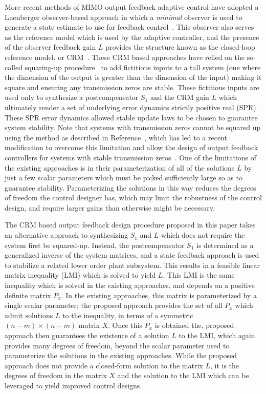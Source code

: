 More recent methods of MIMO output feedback adaptive control have adopted a Luenberger observer-based approach in which a \textit{minimal} observer is used to generate a state estimate to use for feedback control\ \cite{lavretsky.output.2010, lavretskywise.book.2013, qu.jgcd.2016, qu.gnc.2013, wise.obltrdesign.2013}.
This observer also serves as the reference model which is used by the adaptive controller, and the presence of the observer feedback gain $L$ provides the structure known as the closed-loop reference model, or CRM\ \cite{gibson.aiaacrm.2012, gibson.acc.2013, gibson.ecc.2013, gibson.ieeeaccess.2013}.
These CRM based approaches have relied on the so-called squaring-up procedure\ \cite{misra.squareup.1992} to add fictitious inputs to a tall system (one where the dimension of the output is greater than the dimension of the input) making it square and ensuring any transmission zeros are stable.
These fictitious inputs are used only to synthesize a postcompensator $S_{1}$ and the CRM gain $L$ which ultimately render a set of underlying error dynamics strictly positive real (SPR).
These SPR error dynamics allowed stable update laws to be chosen to guarantee system stability.
Note that systems with transmission zeros cannot be squared up using the method as described in Reference\ \cite{misra.squareup.1992}, which has led to a recent modification to overcome this limitation and allow the design of output feedback controllers for systems with stable transmission zeros\ \cite{quwiese.ifac.2014}.
One of the limitations of the existing approaches is in their parameterization of all of the solutions $L$ by just a few scalar parameters which must be picked sufficiently large so as to guarantee stability.
Parameterizing the solutions in this way reduces the degrees of freedom the control designer has, which may limit the robustness of the control design, and require larger gains than otherwise might be necessary.

The CRM based output feedback design procedure proposed in this paper takes an alternative approach to synthesizing $S_{1}$ and $L$ which does not require the system first be squared-up.
Instead, the postcompensator $S_{1}$ is determined as a generalized inverse of the system matrices, and a state feedback approach is used to stabilize a related lower order plant subsystem.
This results in a feasible linear matrix inequality (LMI) which is solved to yield $L$.
This LMI is the same inequality which is solved in the existing approaches, and depends on a positive definite matrix $P_{x}$.
In the existing approaches, this matrix is parameterized by a single scalar parameter; the proposed approach provides the set of all $P_{x}$ which admit solutions $L$ to the inequality, in terms of a symmetric $(n-m)\times(n-m)$ matrix $X$.
Once this $P_{x}$ is obtained the, proposed approach then guarantees the existence of a solution $L$ to the LMI, which again provides many degrees of freedom, beyond the scalar parameter used to parameterize the solutions in the existing approaches.
While the proposed approach does not provide a closed-form solution to the matrix $L$, it is the degrees of freedom in the matrix $X$ and the solution to the LMI which can be leveraged to yield improved control designs.

